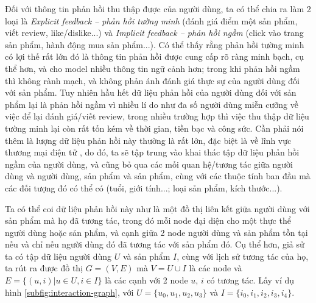 Đối với thông tin phản hồi thu thập được của người dùng, ta có thể chia ra làm 2 loại \cite{CF-for-implicit-feedback} là \textit{Explicit feedback -- phản hồi tường minh} (đánh giá điểm một sản phẩm, viết review, like/dislike...) và \textit{Implicit feedback -- phản hồi ngầm} (click vào trang sản phẩm, hành động mua sản phẩm...). Có thể thấy rằng phản hồi tường minh có lợi thế rất lớn đó là thông tin phản hồi được cung cấp rõ ràng minh bạch, cụ thể hơn, và cho model nhiều thông tin ngữ cảnh hơn; trong khi phản hồi ngầm thì không rành mạch, và không phản ánh đánh giá thực sự của người dùng đối với sản phẩm. Tuy nhiên hầu hết dữ liệu phản hồi của người dùng đối với sản phẩm lại là phản hồi ngầm \cite{denoise-implicit-feedback} vì nhiều lí do như đa số người dùng miễn cưỡng về việc để lại đánh giá/viết review, trong nhiều trường hợp thì việc thu thập dữ liệu tường minh lại còn rất tốn kém về thời gian, tiền bạc và công sức. Cần phải nói thêm là lượng dữ liệu phản hồi này thường là rất lớn, đặc biệt là về lĩnh vực thương mại điện tử \cite{large-scale-amazon-reviews}, do đó, ta sẽ tập trung vào khai thác tập dữ liệu phản hồi ngầm của người dùng, và cũng bỏ qua các mối quan hệ/tương tác giữa người dùng và người dùng, sản phẩm và sản phẩm, cùng với các thuộc tính ban đầu mà các đối tượng đó có thể có (tuổi, giới tính...; loại sản phẩm, kích thước...).

Ta có thể coi dữ liệu phản hồi này như là một đồ thị liên kết giữa người dùng với sản phẩm mà họ đã tương tác, trong đó mỗi node đại diện cho một thực thể người dùng hoặc sản phẩm, và cạnh giữa 2 node người dùng và sản phẩm tồn tại nếu và chỉ nếu người dùng đó đã tương tác với sản phẩm đó. Cụ thể hơn, giả sử ta có tập dữ liệu người dùng $U$ và sản phẩm $I$, cùng với lịch sử tương tác của họ, ta rút ra được đồ thị $G = (V, E)$ mà $V = U \cup I$ là các node và $E = \{(u, i) | u \in U, i \in I\}$ là các cạnh với 2 node $u$, $i$ có tương tác. Lấy ví dụ hình \ref{subfig:interaction-graph}, với $U = \{u_0, u_1, u_2, u_3\}$ và $I = \{i_0, i_1, i_2, i_3, i_4\}$.

